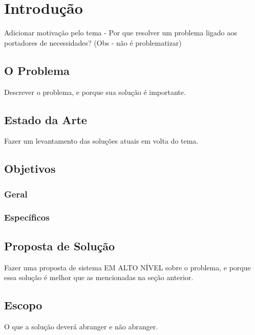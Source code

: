 \chapter{Introdução}

Adicionar motivação pelo tema - Por que resolver um problema ligado aos portadores de necessidades? (Obs - não é problematizar)

\section{O Problema}

Descrever o problema, e porque sua solução é importante.

\section{Estado da Arte}

Fazer um levantamento das soluções atuais em volta do tema.

\section{Objetivos}

\subsection{Geral}

\subsection{Específicos}

\section{Proposta de Solução}

Fazer uma proposta de sistema EM ALTO NÍVEL sobre o problema, e porque essa solução é melhor que as mencionadas na seção anterior.

\section{Escopo}

O que a solução deverá abranger e não abranger.
